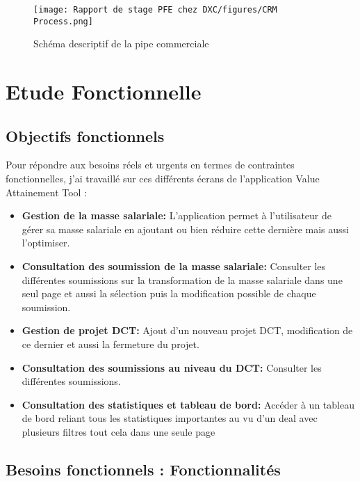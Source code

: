 \begin{figure}[!h]
    \centering
    \texttt{[image: Rapport de stage PFE chez DXC/figures/CRM Process.png]}
    \caption{Schéma descriptif de la pipe commerciale}
\end{figure}

\newpage
\section{Etude Fonctionnelle}

\subsection{Objectifs fonctionnels}

Pour répondre aux besoins réels et urgents en termes de contraintes fonctionnelles, j'ai travaillé sur ces différents écrans de l'application Value Attainement Tool :
\\
\begin{itemize}
    \item \textbf{Gestion de la masse salariale:} L'application permet à l'utilisateur de gérer sa masse salariale en ajoutant ou bien réduire cette dernière mais aussi l'optimiser.
    \\
    \item \textbf{Consultation des soumission de la masse salariale:} Consulter les différentes soumissions sur la transformation de la masse salariale dans une seul page et aussi la sélection puis la modification possible de chaque soumission.
    \\
    \item \textbf{Gestion de projet DCT:} Ajout d'un nouveau projet DCT, modification de ce dernier et aussi la fermeture du projet.
    \\
    \item \textbf{Consultation des soumissions au niveau du DCT:} Consulter les différentes soumissions.
    \\
    \item \textbf{Consultation des statistiques et tableau de bord:} Accéder à un tableau de bord reliant tous les statistiques importantes au vu d'un deal avec plusieurs filtres tout cela dans une seule page
\end{itemize}

\subsection{Besoins fonctionnels : Fonctionnalités}


